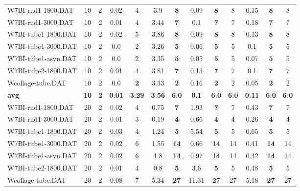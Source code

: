 \begin{table}[h]
{\begin{tabular}{lcccccccccccc}
W7BI-rnd1-1800.DAT & 10 & 2 &  \textcolor{blue2}{0.02} & 4 & 3.9 &  \textbf{8} & 0.09 &  \textbf{8} & 8 & 0.15 &  \textbf{8} & 8 \\
W7BI-rnd1-3000.DAT & 10 & 2 &  \textcolor{blue2}{0.01} & 4 & 3.44 &  \textbf{7} & 0.1 &  \textbf{7} & 7 & 0.18 &  \textbf{7} & 7 \\
W7BI-tube1-1800.DAT & 10 & 2 &  \textcolor{blue2}{0.02} & 5 & 3.86 &  \textbf{8} & 0.09 &  \textbf{8} & 8 & 0.13 &  \textbf{8} & 8 \\
W7BI-tube1-3000.DAT & 10 & 2 &  \textcolor{blue2}{0.0} & 2 & 3.26 &  \textbf{5} & 0.06 &  \textbf{5} & 5 & 0.1 &  \textbf{5} & 5 \\
W7BI-tube1-asyn.DAT & 10 & 2 &  \textcolor{blue2}{0.0} & 2 & 3.35 &  \textbf{5} & 0.05 &  \textbf{5} & 5 & 0.07 &  \textbf{5} & 5 \\
W7BI-tube2-1800.DAT & 10 & 2 &  \textcolor{blue2}{0.01} & 4 & 3.81 &  \textbf{7} & 0.13 &  \textbf{7} & 7 & 0.1 &  \textbf{7} & 7 \\
Wcollage-tube.DAT & 10 & 2 &  \textcolor{blue2}{0.0} &  \textbf{2} & 3.33 &  \textbf{2} & 0.16 &  \textbf{2} & 2 & 0.05 &  \textbf{2} & 2 \\
\cline{1-13} \textbf{avg} & \textbf{10} & \textbf{2} & \textbf{0.01} & \textbf{3.29} & \textbf{3.56} & \textbf{6.0} & \textbf{0.1} & \textbf{6.0} & \textbf{6.0} & \textbf{0.11} & \textbf{6.0} & \textbf{6.0} \\ \cline{1-13}
W7BI-rnd1-1800.DAT & 20 & 2 &  \textcolor{blue2}{0.02} & 4 & 0.75 &  \textbf{7} & 1.93 &  \textbf{7} & 7 & 0.43 &  \textbf{7} & 7 \\
W7BI-rnd1-3000.DAT & 20 & 2 &  \textcolor{blue2}{0.01} & 3 & 0.19 &  \textbf{4} & 0.66 &  \textbf{4} & 4 & 0.26 &  \textbf{4} & 4 \\
W7BI-tube1-1800.DAT & 20 & 2 &  \textcolor{blue2}{0.03} & 4 & 1.24 &  \textbf{5} & 5.54 &  \textbf{5} & 5 & 0.65 &  \textbf{5} & 5 \\
W7BI-tube1-3000.DAT & 20 & 2 &  \textcolor{blue2}{0.02} & 6 & 1.55 &  \textbf{14} & 0.66 &  \textbf{14} & 14 & 0.41 &  \textbf{14} & 14 \\
W7BI-tube1-asyn.DAT & 20 & 2 &  \textcolor{blue2}{0.02} & 6 & 1.8 &  \textbf{14} & 0.97 &  \textbf{14} & 14 & 0.42 &  \textbf{14} & 14 \\
W7BI-tube2-1800.DAT & 20 & 2 &  \textcolor{blue2}{0.01} & 4 & 0.8 &  \textbf{5} & 3.6 &  \textbf{5} & 5 & 0.48 &  \textbf{5} & 5 \\
Wcollage-tube.DAT & 20 & 2 &  \textcolor{blue2}{0.08} & 7 & 5.34 &  \textbf{27} & 11.31 &  \textbf{27} & 27 & 5.18 &  \textbf{27} & 27 \\

\end{tabular}}
\end{table}

